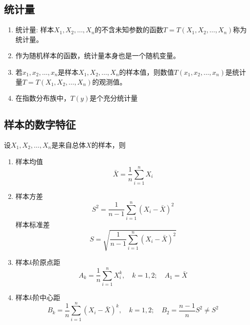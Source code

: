 \subsection{统计量}
\begin{enumerate}
	\item 统计量: 样本$X_1, X_2, \dots, X_n$的不含未知参数的函数$T = T(X_1, X_2, \dots, X_n)$称为统计量。
	\item 作为随机样本的函数，统计量本身也是一个随机变量。
	\item 若$x_1, x_2, \dots, x_n$是样本$X_1, X_2, \dots, X_n$的样本值，则数值$T(x_1, x_2, \dots, x_n)$是统计量$T = T(X_1, X_2, \dots, X_n)$的观测值。
	\item 在指数分布族中，$T(y)$是个充分统计量
\end{enumerate}

\subsection{样本的数字特征}
设$X_1, X_2, \dots, X_n$是来自总体$X$的样本，则
\begin{enumerate}
	\item 样本均值
	\begin{equation}
		\bar X = \frac{1}{n}\sum_{i=1}^{n} X_i
	\end{equation}

	\item 样本方差
	\begin{equation}
		S^2 = \frac{1}{n-1}\sum_{i=1}^{n}(X_i - \bar X)^2
	\end{equation}
	样本标准差
	\begin{equation}
		S = \sqrt{\frac{1}{n-1}\sum_{i=1}^{n}(X_i - \bar X)^2}
	\end{equation}

	\item 样本$k$阶原点距
	\begin{equation}
		A_k = \frac{1}{n}\sum_{i=1}^{n}X_i^k, \quad k = 1, 2; \quad A_1 = \bar X
	\end{equation}

	\item 样本$k$阶中心距
	\begin{equation}
		B_k = \frac{1}{n}\sum_{i=1}^{n}(X_i - \bar X)^k, \quad k = 1, 2; \quad B_2 = \frac{n-1}{n}S^2 \neq S^2
	\end{equation}
\end{enumerate}

